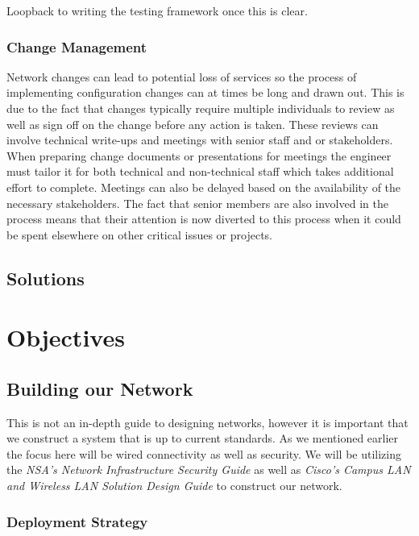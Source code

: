 \documentclass[12pt, letterpaper]{article}
\begin{document}
\smallskip

Loopback to writing the testing framework once this is clear.

	
	\subsubsection{Change Management}
Network changes can lead to potential loss of services so the process of implementing configuration changes can at times be long and drawn out. This is due to the fact that changes typically require multiple individuals to review as well as sign off on the change before any action is taken. These reviews can involve technical write-ups and meetings with senior staff and or stakeholders. When preparing change documents or presentations for meetings the engineer must tailor it for both technical and non-technical staff which takes additional effort to complete. Meetings can also be delayed based on the availability of the necessary stakeholders. The fact that senior members are also involved in the process means that their attention is now diverted to this process when it could be spent elsewhere on other critical issues or projects.


	\subsection{Solutions}


\newpage

\section{Objectives}

	\subsection{Building our Network}
This is not an in-depth guide to designing networks, however it is important that we construct a system that is up to current standards. As we mentioned earlier the focus here will be wired connectivity as well as security. We will be utilizing the \textit{NSA’s Network Infrastructure Security Guide} as well as \textit{Cisco’s Campus LAN and Wireless LAN Solution Design Guide} to construct our network.

	\subsubsection{Deployment Strategy}
\end{document}
